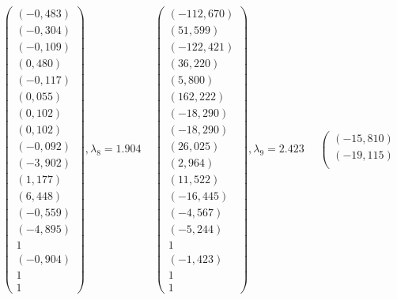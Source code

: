 \documentclass[a5paper, 10pt]{article}
\theoremstyle{definition}
\theoremstyle{plain}
\theoremstyle{remark}
\begin{document}
\begin{equation*}
\left(\begin{matrix}
\left(-0,483\right) \\
\left(-0,304\right) \\
\left(-0,109\right) \\
\left(0,480\right) \\
\left(-0,117\right) \\
\left(0,055\right) \\
\left(0,102\right) \\
\left(0,102\right) \\
\left(-0,092\right) \\
\left(-3,902\right) \\
\left(1,177\right) \\
\left(6,448\right) \\
\left(-0,559\right) \\
\left(-4,895\right) \\
1 \\
\left(-0,904\right) \\
1 \\
1
\end{matrix}\right)
,  \lambda_ 8 = 1.904\,\,\,\,\,\,\,
\left(\begin{matrix}
\left(-112,670\right) \\
\left(51,599\right) \\
\left(-122,421\right) \\
\left(36,220\right) \\
\left(5,800\right) \\
\left(162,222\right) \\
\left(-18,290\right) \\
\left(-18,290\right) \\
\left(26,025\right) \\
\left(2,964\right) \\
\left(11,522\right) \\
\left(-16,445\right) \\
\left(-4,567\right) \\
\left(-5,244\right) \\
1 \\
\left(-1,423\right) \\
1 \\
1
\end{matrix}\right)
,  \lambda_ 9 = 2.423\,\,\,\,\,\,\,\,
\left(\begin{matrix}
\left(-15,810\right) \\
\left(-19,115\right) \\

\end{matrix}
\end{equation*}
\end{document}
